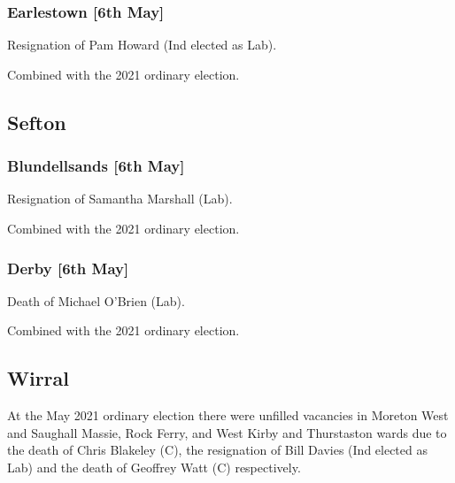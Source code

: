 \documentclass[a4paper,openany]{book}
\begin{document}
\begin{resultsiii}
\subsubsection*{Earlestown \hspace*{\fill}\nolinebreak[1]%
	\enspace\hspace*{\fill}
	[6th May]}


Resignation of Pam Howard (Ind elected as Lab).

Combined with the 2021 ordinary election.

\subsection*{Sefton}

\subsubsection*{Blundellsands \hspace*{\fill}\nolinebreak[1]%
	\enspace\hspace*{\fill}
	[6th May]}


Resignation of Samantha Marshall (Lab).

Combined with the 2021 ordinary election.

\subsubsection*{Derby \hspace*{\fill}\nolinebreak[1]%
	\enspace\hspace*{\fill}
	[6th May]}


Death of Michael O'Brien (Lab).

Combined with the 2021 ordinary election.

\subsection*{Wirral}

At the May 2021 ordinary election there were unfilled vacancies in Moreton West and Saughall Massie, Rock Ferry, and West Kirby and Thurstaston wards due to the death of Chris Blakeley (C), the resignation of Bill Davies (Ind elected as Lab) and the death of Geoffrey Watt (C) respectively.


\end{resultsiii}
\end{document}
